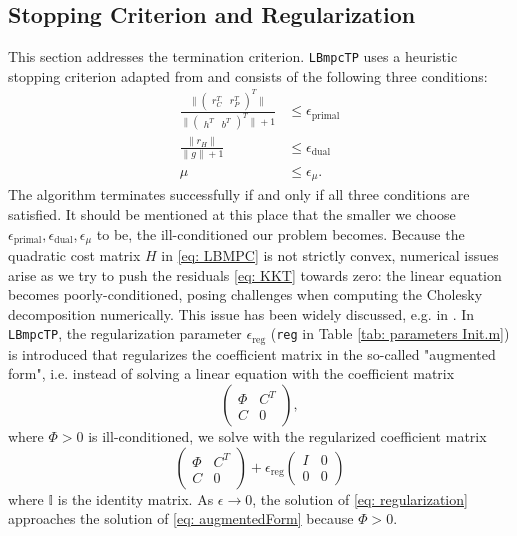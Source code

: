 \documentclass[letter]{article}
\begin{document}
\begin{sffamily}
\subsection{Stopping Criterion and Regularization}
\label{sec: regularization}
This section addresses the termination criterion. \texttt{LBmpcTP} uses a heuristic stopping criterion adapted from \citep{Gertz2003OOQP, VanderbreiLOQO} and consists of the following three conditions:
\begin{align}
\label{eq: stoppingCriteria}
	\frac{\| \begin{pmatrix}   r_C^T & r_P^T  \end{pmatrix}^T \|}{ \| \begin{pmatrix} h^T & b^T \end{pmatrix}^T \|+1    } &\leq \epsilon_\text{primal} \\
	\frac{\|r_H\|}{\|g\|+1} &\leq \epsilon_\text{dual}	\nonumber  \\
	\mu &\leq \epsilon_\mu \nonumber.
\end{align}
The algorithm terminates successfully if and only if all three conditions are satisfied. It should be mentioned at this place that the smaller we choose $\epsilon_{\text{primal}},\epsilon_{\text{dual}},\epsilon_{\mu}$ to be, the ill-conditioned our problem becomes. Because the quadratic cost matrix $H$ in \eqref{eq: LBMPC} is not strictly convex, numerical issues arise as we try to push the residuals \eqref{eq: KKT} towards zero: the linear equation becomes poorly-conditioned, posing challenges when computing the Cholesky decomposition numerically. This issue has been widely discussed, e.g. in \citep{Wright1997StabAugSystemFact, Wright1995StabilityLinEqSolversIPM}. In \texttt{LBmpcTP}, the regularization parameter $\epsilon_\text{reg}$ (\texttt{reg} in Table \ref{tab: parameters Init.m}) is introduced that regularizes the coefficient matrix in the so-called "augmented form", i.e. instead of solving a linear equation with the coefficient matrix
\begin{equation}
\label{eq: augmentedForm}
\begin{pmatrix}
\Phi & C^T \\
		C & 0
	\end{pmatrix},
\end{equation}
where $\Phi>0$ is ill-conditioned, we solve with the regularized coefficient matrix
\begin{equation}
\label{eq: regularization}
	\begin{pmatrix}
		\Phi & C^T \\
		C & 0
	\end{pmatrix} + 
	\epsilon_\text{reg}
	\begin{pmatrix}
		I & 0 \\ 0 & 0
	\end{pmatrix}
\end{equation}
where $\mathbb{I}$ is the identity matrix. As $\epsilon\to0$, the solution of \eqref{eq: regularization} approaches the solution of \eqref{eq: augmentedForm} because $\Phi>0$.


\end{sffamily}
\end{document}
